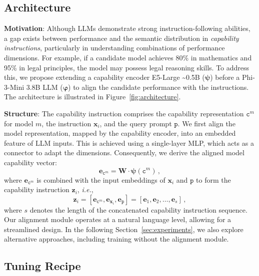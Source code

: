\subsection{Architecture}

\textbf{Motivation}: Although LLMs demonstrate strong instruction-following abilities, a gap exists between performance and the semantic distribution in \textit{capability instructions}, particularly in understanding combinations of performance dimensions. For example, if a candidate model achieves 80\% in mathematics and 95\% in legal principles, the model may possess legal reasoning skills.
To address this, we propose extending a capability encoder E5-Large \textasciitilde0.5B ($\boldsymbol{\psi}$) before a Phi-3-Mini 3.8B LLM ($\boldsymbol{\varphi}$) to align the candidate performance with the instructions. The architecture is illustrated in Figure~\ref{fig:architecture}.

\textbf{Structure}: The capability instruction comprises the capability representation $\texttt{c}^m$ for model $m$, the instruction $\mathbf{x}_i$, and the query prompt $\texttt{p}$. We first align the model representation, mapped by the capability encoder, into an embedded feature of LLM inputs. This is achieved using a single-layer MLP, which acts as a connector to adapt the dimensions. Consequently, we derive the aligned model capability vector:
\begin{equation}
    \mathbf{e}_{\texttt{c}^m} = \mathbf{W} \cdot \boldsymbol{\psi} \left( \texttt{c}^m \right)\,,
\end{equation}
where $\mathbf{e}_{\texttt{c}^m}$ is combined with the input embeddings of $\mathbf{x}_i$ and $\texttt{p}$ to form the capability instruction $\mathbf{z}_{i}$, \textit{i.e.},
\begin{equation}
    \mathbf{z}_{i} = [\mathbf{e}_{\texttt{c}^m}, \mathbf{e}_{\mathbf{x}_i}, \mathbf{e}_{\texttt{p}}] = [\mathbf{e}_1, \mathbf{e}_2, \ldots, \mathbf{e}_s]\,,
\end{equation}
where $s$ denotes the length of the concatenated capability instruction sequence. Our alignment module operates at a natural language level, allowing for a streamlined design.  In the following Section~\ref{sec:experiments}, we also explore alternative approaches, including training without the alignment module.

\subsection{Tuning Recipe}

